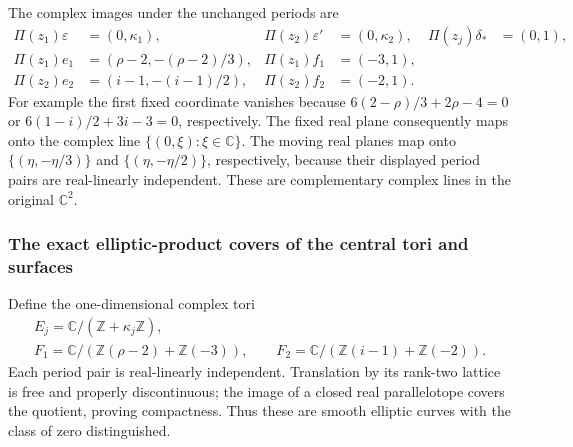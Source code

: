 The complex images under the unchanged periods are
\[
\begin{aligned}
 \Pi(z_1)\varepsilon&=(0,\kappa_1),&
 \Pi(z_2)\varepsilon'&=(0,\kappa_2),&
 \Pi(z_j)\delta_*&=(0,1),\\
 \Pi(z_1)e_1&=(\rho-2,-(\rho-2)/3),&
 \Pi(z_1)f_1&=(-3,1),\\
 \Pi(z_2)e_2&=(i-1,-(i-1)/2),&
 \Pi(z_2)f_2&=(-2,1).
\end{aligned}
\tag{FF10}\label{wb:ffcert:eq:complex-images}
\]
For example the first fixed coordinate vanishes because
$6(2-\rho)/3+2\rho-4=0$ or $6(1-i)/2+3i-3=0$, respectively.
The fixed real plane consequently maps onto the complex line
$\{(0,\xi):\xi\in\mathbb C\}$. The moving real planes map onto
$\{(\eta,-\eta/3)\}$ and $\{(\eta,-\eta/2)\}$, respectively,
because their displayed period pairs are real-linearly independent.
These are complementary complex lines in the original $\mathbb C^2$.

\subsubsection{The exact elliptic-product covers of the central tori and surfaces}

Define the one-dimensional complex tori
\[
\begin{gathered}
 E_j=\mathbb C/(\mathbb Z+\kappa_j\mathbb Z),\\
 F_1=\mathbb C/(\mathbb Z(\rho-2)+\mathbb Z(-3)),\qquad
 F_2=\mathbb C/(\mathbb Z(i-1)+\mathbb Z(-2)).
\end{gathered}
\tag{FF11}\label{wb:ffcert:eq:elliptic-factors}
\]
Each period pair is real-linearly independent. Translation by its rank-two
lattice is free and properly discontinuous; the image of a closed real
parallelotope covers the quotient, proving compactness. Thus these are
smooth elliptic curves with the class of zero distinguished.

